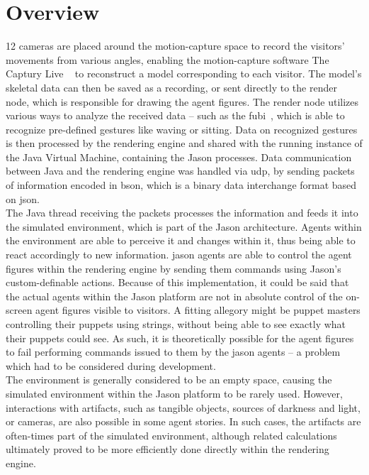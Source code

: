 \documentclass[draft,final]{vutinfth} %
\begin{document}
\section{Overview}
\label{chap:overview}

12 cameras are placed around the motion-capture space to record the \glspl{visitor}’ movements from various angles, enabling the motion-capture software The Captury Live ~\cite{capturyLive} to reconstruct a model corresponding to each \gls{visitor}. 
The model’s skeletal data can then be saved as a recording, or sent directly to the render node, which is responsible for drawing the \glspl{agent figure}. 
The render node utilizes various ways to analyze the received data – such as the \gls{fubi}~\cite{fubi}, which is able to recognize pre-defined gestures like waving or sitting. 
Data on recognized gestures is then processed by the rendering engine and shared with the running instance of the Java Virtual Machine, containing the Jason processes. 
Data communication between Java and the rendering engine was handled via \gls{udp}, by sending packets of information encoded in \gls{bson}, which is a binary data interchange format based on \gls{json}. \\
The Java thread receiving the packets processes the information and feeds it into the simulated environment, which is part of the Jason architecture. 
Agents within the environment are able to perceive it and changes within it, thus being able to react accordingly to new information. 
\Glspl{jason agent} are able to control the \glspl{agent figure} within the rendering engine by sending them commands using Jason’s custom-definable actions. 
Because of this implementation, it could be said that the actual agents within the Jason platform are not in absolute control of the on-screen \glspl{agent figure} visible to \glspl{visitor}. 
A fitting allegory might be puppet masters controlling their puppets using strings, without being able to see exactly what their puppets could see. 
As such, it is theoretically possible for the \glspl{agent figure} to fail performing commands issued to them by the \glspl{jason agent} – a problem which had to be considered during development. \\
The environment is generally considered to be an empty space, causing the simulated environment within the Jason platform to be rarely used. 
However, interactions with artifacts, such as tangible objects, sources of darkness and light, or cameras, are also possible in some agent stories. 
In such cases, the artifacts are often-times part of the simulated environment, although related calculations ultimately proved to be more efficiently done directly within the rendering engine. \\
\end{document}
